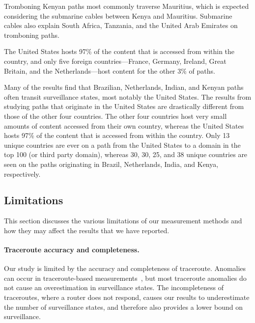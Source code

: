 Tromboning Kenyan paths most commonly traverse Mauritius, which is expected considering the submarine cables between Kenya and Mauritius.  Submarine cables also explain South Africa, Tanzania, and the United Arab Emirates on tromboning paths.  

\begin{finding}
The United States hosts 97\% of the content that is accessed from within the country, and only five foreign countries---France, Germany, Ireland, Great Britain, and the Netherlands---host content for the other 3\% of paths.
\end{finding}
\noindent
Many of the results find that Brazilian,
Netherlands, Indian, and Kenyan paths often transit surveillance states,
most notably the United States.  The results from studying paths that
originate in the United States are drastically different from those of
the other four countries.  The other four countries host very small
amounts of content accessed from their own country, whereas the United
States hosts 97\% of the content that is accessed from within the
country.  Only 13 unique countries are ever on a path from the United
States to a domain in the top 100 (or third party domain), whereas 30,
30, 25, and 38 unique countries are seen on the paths originating in
Brazil, Netherlands, India, and Kenya, respectively.   


\subsection{Limitations}

This section discusses the various limitations of our measurement methods
and how they may affect the results that we have reported.

\paragraph{Traceroute accuracy and completeness.}
Our study is limited by the accuracy and completeness of traceroute.
Anomalies can occur in traceroute-based
measurements~\cite{augustin2006avoiding}, but most traceroute anomalies
do not cause an overestimation in surveillance states.  The
incompleteness of traceroutes, where a router does not respond, causes
our results to underestimate the number of surveillance states, and
therefore also provides a lower bound on surveillance. 

